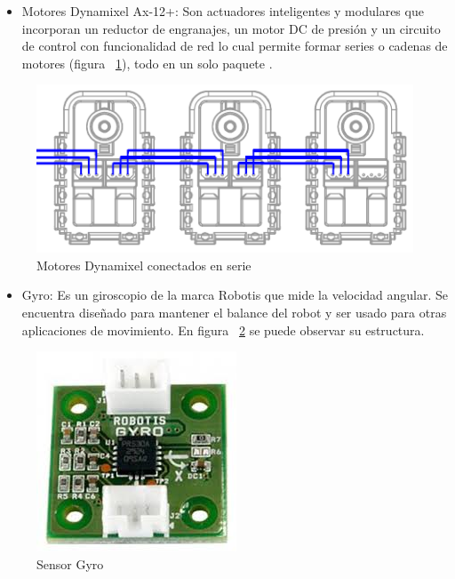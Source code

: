 \begin{itemize}

\item Motores Dynamixel Ax-12+: Son actuadores inteligentes y modulares que incorporan un reductor de engranajes, un motor DC de presión y un circuito de control con funcionalidad de red lo cual permite formar series o cadenas de motores (figura ~\ref{fig:motoresDc}), todo en un solo paquete \cite{manual}. 
\end{itemize}

\begin{figure}[hbtp]

\centering
\includegraphics[scale=0.5]{imagenes/AX-12_serie.png}
\caption{Motores Dynamixel conectados en serie}
\label{fig:motoresDc}
\end{figure}

\begin{itemize}
\item Gyro: Es un giroscopio de la marca Robotis que mide la velocidad angular. Se encuentra diseñado para mantener el balance del robot y ser usado para otras aplicaciones de movimiento\cite{gyro}. En figura ~\ref{fig:gyro} se puede observar su estructura.  

\end{itemize}

\begin{figure}[hbtp]
\centering
\includegraphics[scale=0.35]{imagenes/gyro.jpg}
\caption{Sensor Gyro}
\label{fig:gyro}
\end{figure}

